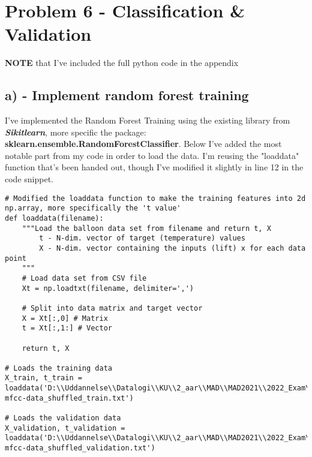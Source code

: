 \section{Problem 6 - Classification \& Validation}
\textbf{NOTE} that I've included the full python code in the appendix




\subsection{a) - Implement random forest training}

I've implemented the Random Forest Training using the existing library from \textbf{\textit{Sikitlearn}}, more specific
the package: \textbf{sklearn.ensemble.RandomForestClassifier}.
Below I've added the most notable part from my code in order to load the data. I'm reusing the "loaddata" function
that's been handed out, though I've modified it slightly in line 12 in the code snippet.
\begin{verbatim}
# Modified the loaddata function to make the training features into 2d np.array, more specifically the 't value'
def loaddata(filename):
    """Load the balloon data set from filename and return t, X
        t - N-dim. vector of target (temperature) values
        X - N-dim. vector containing the inputs (lift) x for each data point
    """
    # Load data set from CSV file
    Xt = np.loadtxt(filename, delimiter=',')
    
    # Split into data matrix and target vector
    X = Xt[:,0] # Matrix
    t = Xt[:,1:] # Vector
    
    return t, X

# Loads the training data
X_train, t_train = loaddata('D:\\Uddannelse\\Datalogi\\KU\\2_aar\\MAD\\MAD2021\\2022_Exam\\exam_data\\data\\accent-mfcc-data_shuffled_train.txt')

# Loads the validation data
X_validation, t_validation = loaddata('D:\\Uddannelse\\Datalogi\\KU\\2_aar\\MAD\\MAD2021\\2022_Exam\\exam_data\\data\\accent-mfcc-data_shuffled_validation.txt')

\end{verbatim}


